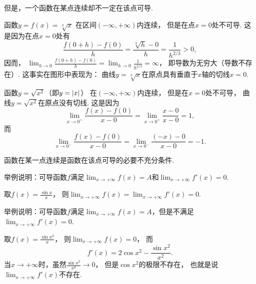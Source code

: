 但是，一个函数在某点连续却不一定在该点可导.
\begin{example}
函数\(y=f(x)=\sqrt[3]x\)
在区间\((-\infty,+\infty)\)内连续，
但是在点\(x=0\)处不可导.
这是因为在点\(x=0\)处有\[
	\frac{f(0+h)-f(0)}{h}
	=\frac{\sqrt[3]{h}-0}{h}
	=\frac{1}{h^{2/3}}>0,
\]
因而，
\(\lim_{h\to0} \frac{f(0+h)-f(0)}{h}
=\lim_{h\to0} \frac{1}{h^{2/3}}
=\infty\)，
即导数为无穷大（导数不存在）.
这事实在图形中表现为：
曲线\(y=\sqrt[3]x\)在原点具有垂直于\(x\)轴的切线\(x=0\).
\end{example}

\begin{example}
函数\(y=\sqrt{x^2}\)（即\(y=\abs{x}\)）
在\((-\infty,+\infty)\)内连续，
但是在\(x=0\)处不可导，
曲线\(y=\sqrt{x^2}\)在原点没有切线.
这是因为\[
	\lim_{x\to0^+} \frac{f(x)-f(0)}{x-0}
	= \lim_{x\to0^+} \frac{x-0}{x-0}
	= 1,
\]
而\[
	\lim_{x\to0^-} \frac{f(x)-f(0)}{x-0}
	= \lim_{x\to0^-} \frac{(-x)-0}{x-0}
	= -1.
\]
\end{example}

\begin{remark}
函数在某一点连续是函数在该点可导的必要不充分条件.
\end{remark}


\begin{example}
举例说明：可导函数\(f\)满足\(\lim_{x\to+\infty} f(x) = A\)和\(\lim_{x\to+\infty} f'(x) = 0\).
\begin{solution}
取\(f(x) = \frac{\sin x}{x}\)，
则\(\lim_{x\to+\infty} f(x) = \lim_{x\to+\infty} f'(x) = 0\).
\end{solution}
\end{example}
\begin{example}
举例说明：可导函数\(f\)满足\(\lim_{x\to+\infty} f(x) = A\)，但是不满足\(\lim_{x\to+\infty} f'(x) = 0\).
\begin{solution}
取\(f(x) = \frac{\sin x^2}{x}\)，
则\(\lim_{x\to+\infty} f(x) = 0\)，
而\[
	f'(x) = 2 \cos x^2 - \frac{\sin x^2}{x^2}.
\]
当\(x\to+\infty\)时，虽然\(\frac{\sin x^2}{x^2} \to 0\)，
但是\(\cos x^2\)的极限不存在，
也就是说\(\lim_{x\to+\infty} f'(x)\)不存在.
\end{solution}
\end{example}
